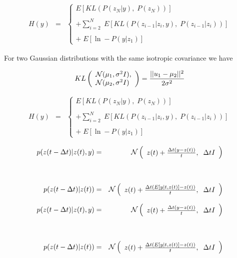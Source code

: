 {

{\huge
\begin{eqnarray*}
  H(y) & = & \left\{\begin{array}{l} E[KL(P(z_N|y),\;P(z_N))] \\ \\ + \sum_{i=2}^N  \; E[KL(P(z_{i-1}|z_i,y),\;P(z_{i-1}|z_i))] \\ \\ +\;E[\ln -P(y|z_1)] \end{array}\right.
  \end{eqnarray*}

\vfill
For two Gaussian distributions with the same isotropic covariance we have

\vfill
$$KL\left(\begin{array}{l}{\cal N}(\mu_1,\sigma^2 I), \\ {\cal N}(\mu_2,\sigma^2 I) \end{array}\right) = \frac{||u_1 -\mu_2||^2}{2\sigma^2}$$
}

{\huge
\begin{eqnarray*}
  H(y) & = & \left\{\begin{array}{l} E[KL(P(z_N|y),\;P(z_N))] \\ \\ + \sum_{i=2}^N  \; E[KL(P(z_{i-1}|z_i,y),\;P(z_{i-1}|z_i))] \\ \\ +\;E[\ln -P(y|z_1)] \end{array}\right.
\end{eqnarray*}

\vfill
\begin{eqnarray*}
  p(z(t - \Delta t)|z(t),y) & = & {\cal N}\left(\begin{array}{l}z(t) + \frac{\Delta t(y - z(t))}{t},\;\; \Delta t I\end{array}\right) \\
  \\
  \\
  p(z(t - \Delta t)|z(t)) & = & {\cal N}\left(\begin{array}{l} z(t) + \frac{\Delta t(E[y|t,z(t)] - z(t))}{t}, \;\; \Delta t I\end{array}\right)
\end{eqnarray*}
}

{\huge
\begin{eqnarray*}
  p(z(t - \Delta t)|z(t),y) & = & {\cal N}\left(\begin{array}{l}z(t) + \frac{\Delta t(y - z(t))}{t},\;\; \Delta t I\end{array}\right) \\
  \\
  \\
  p(z(t - \Delta t)|z(t)) & = & {\cal N}\left(\begin{array}{l} z(t) + \frac{\Delta t(E[y|t,z(t)] - z(t))}{t}, \;\; \Delta t I\end{array}\right)
\end{eqnarray*}

}}

